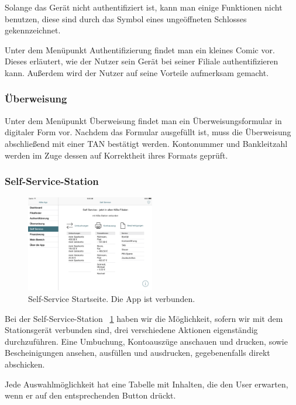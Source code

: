	Solange das Gerät nicht authentifiziert ist, kann man einige Funktionen nicht benutzen, diese sind durch das Symbol eines ungeöffneten Schlosses gekennzeichnet.

	Unter dem Menüpunkt Authentifizierung findet man ein kleines Comic vor. Dieses erläutert, wie der Nutzer sein Gerät bei seiner Filiale authentifizieren kann. Außerdem wird der Nutzer auf seine Vorteile aufmerksam gemacht.

\subsubsection{Überweisung}
	Unter dem Menüpunkt Überweisung findet man ein Überweisungsformular in digitaler Form vor. Nachdem das Formular ausgefüllt ist, muss die Überweisung abschließend mit einer TAN bestätigt werden. Kontonummer und Bankleitzahl werden im Zuge dessen auf Korrektheit ihres Formats geprüft.

\subsubsection{Self-Service-Station}
\begin{figure}[h]
	\centering
  \includegraphics[width=0.5\textwidth]{Pictures/SSverbunden}
	\caption{Self-Service Startseite. Die App ist verbunden.}
	\label{fig5}
\end{figure}

\noindent	Bei der Self-Service-Station ~\ref{fig5} haben wir die Möglichkeit, sofern wir mit dem Stationsgerät verbunden sind, drei verschiedene Aktionen eigenständig durchzuführen. Eine Umbuchung, Kontoauszüge anschauen und drucken, sowie Bescheinigungen ansehen, ausfüllen und ausdrucken, gegebenenfalls direkt abschicken.

	Jede Auswahlmöglichkeit hat eine Tabelle mit Inhalten, die den User erwarten, wenn er auf den entsprechenden Button drückt.

